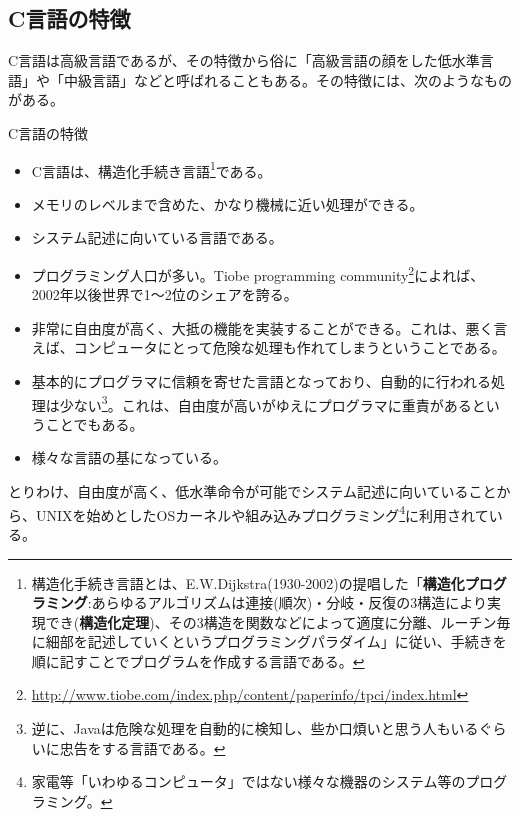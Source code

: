 \subsection{C言語の特徴}
C言語は高級言語であるが、その特徴から俗に「高級言語の顔をした低水準言語」や「中級言語」などと呼ばれることもある。その特徴には、次のようなものがある。
\begin{itembox}[l]{C言語の特徴}
\begin{itemize}
\item C言語は、構造化手続き言語\footnote{構造化手続き言語とは、E.W.Dijkstra(1930-2002)の提唱した「\textbf{構造化プログラミング}:あらゆるアルゴリズムは連接(順次)・分岐・反復の3構造により実現でき(\textbf{構造化定理})、その3構造を関数などによって適度に分離、ルーチン毎に細部を記述していくというプログラミングパラダイム」に従い、手続きを順に記すことでプログラムを作成する言語である。}である。
\item メモリのレベルまで含めた、かなり機械に近い処理ができる。
\item システム記述に向いている言語である。
\item プログラミング人口が多い。Tiobe programming community\footnote{\url{http://www.tiobe.com/index.php/content/paperinfo/tpci/index.html}}によれば、2002年以後世界で1〜2位のシェアを誇る。
\item 非常に自由度が高く、大抵の機能を実装することができる。これは、悪く言えば、コンピュータにとって危険な処理も作れてしまうということである。
\item 基本的にプログラマに信頼を寄せた言語となっており、自動的に行われる処理は少ない\footnote{逆に、Javaは危険な処理を自動的に検知し、些か口煩いと思う人もいるぐらいに忠告をする言語である。}。これは、自由度が高いがゆえにプログラマに重責があるということでもある。
\item 様々な言語の基になっている。
\end{itemize}
\end{itembox}

とりわけ、自由度が高く、低水準命令が可能でシステム記述に向いていることから、UNIXを始めとしたOSカーネルや組み込みプログラミング\footnote{家電等「いわゆるコンピュータ」ではない様々な機器のシステム等のプログラミング。}に利用されている。

